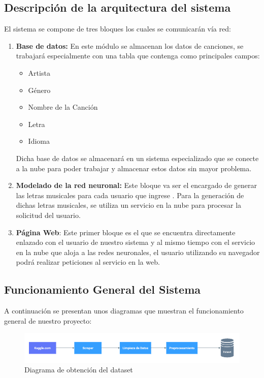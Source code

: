 \documentclass[12pt, a4paper, titlepage]{report}
\begin{document}
		\subsection{Descripci\'on de la arquitectura del sistema}
		El sistema se compone de tres bloques los cuales se comunicar\'an v\'ia red:
		\begin{enumerate}
			\item \textbf{Base de datos:} En este módulo se almacenan los datos de canciones, se trabajará especialmente con una tabla que contenga como principales campos:
			\begin{itemize}
				\item Artista
				\item Género
				\item Nombre de la Canción
				\item Letra
				\item Idioma
			\end{itemize}
			Dicha base de datos se almacenará en un sistema especializado que se conecte a la nube para poder trabajar y almacenar estos datos sin mayor problema.
			\item \textbf{Modelado de la red neuronal:} Este bloque va ser el encargado de generar las letras musicales para cada usuario que ingrese . Para la generación de dichas letras musicales, se utiliza un servicio en la nube para procesar la solicitud del usuario. 
			\item \textbf{Página Web}: Este primer bloque es el que se encuentra directamente enlazado con el usuario de nuestro sistema y al mismo tiempo con el servicio en la nube que aloja a las redes neuronales, el usuario utilizando su navegador podrá realizar peticiones al servicio en la web.
		\end{enumerate}
	
		\subsection{Funcionamiento General del Sistema}
		
		A continuación se presentan unos diagramas que muestran el funcionamiento general de nuestro proyecto:
				
		\begin{figure}[H] \caption{Diagrama de obtención del dataset}
			\includegraphics[scale=.5]{./imagenes/Disenio/Arquitectura/DiagramaFuncGen 1.png}
			\centering 
		\end{figure}
	
\end{document}
